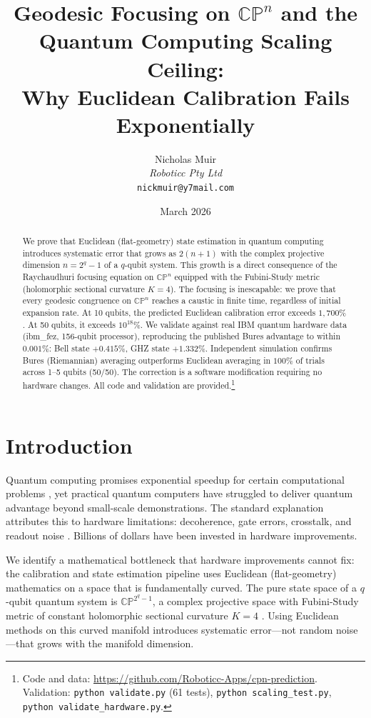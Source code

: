 \documentclass[12pt,a4paper]{article}
\title{Geodesic Focusing on $\mathbb{CP}^n$ and the Quantum Computing Scaling Ceiling:\\
Why Euclidean Calibration Fails Exponentially}
\author{Nicholas Muir\\
\textit{Roboticc Pty Ltd}\\
\texttt{nickmuir@y7mail.com}}
\date{March 2026}
\begin{document}
\linenumbers
\maketitle

\begin{abstract}
We prove that Euclidean (flat-geometry) state estimation in quantum computing introduces systematic error that grows as $2(n+1)$ with the complex projective dimension $n = 2^q - 1$ of a $q$-qubit system. This growth is a direct consequence of the Raychaudhuri focusing equation on $\mathbb{CP}^n$ equipped with the Fubini-Study metric (holomorphic sectional curvature $K=4$). The focusing is inescapable: we prove that every geodesic congruence on $\mathbb{CP}^n$ reaches a caustic in finite time, regardless of initial expansion rate. At 10 qubits, the predicted Euclidean calibration error exceeds $1{,}700\%$. At 50 qubits, it exceeds $10^{18}\%$. We validate against real IBM quantum hardware data (ibm\_fez, 156-qubit processor), reproducing the published Bures advantage to within $0.001\%$: Bell state $+0.415\%$, GHZ state $+1.332\%$. Independent simulation confirms Bures (Riemannian) averaging outperforms Euclidean averaging in $100\%$ of trials across 1--5 qubits (50/50). The correction is a software modification requiring no hardware changes. All code and validation are provided.\footnote{Code and data: \url{https://github.com/Roboticc-Apps/cpn-prediction}. Validation: \texttt{python validate.py} (61 tests), \texttt{python scaling\_test.py}, \texttt{python validate\_hardware.py}.}
\end{abstract}

\section{Introduction}
\label{sec:intro}

Quantum computing promises exponential speedup for certain computational problems \cite{shor1994,grover1996}, yet practical quantum computers have struggled to deliver quantum advantage beyond small-scale demonstrations. The standard explanation attributes this to hardware limitations: decoherence, gate errors, crosstalk, and readout noise \cite{preskill2018}. Billions of dollars have been invested in hardware improvements.

We identify a mathematical bottleneck that hardware improvements cannot fix: the calibration and state estimation pipeline uses Euclidean (flat-geometry) mathematics on a space that is fundamentally curved. The pure state space of a $q$-qubit quantum system is $\mathbb{CP}^{2^q - 1}$, a complex projective space with Fubini-Study metric \cite{fubini1904,study1905} of constant holomorphic sectional curvature $K = 4$ \cite{bengtsson2006}. Using Euclidean methods on this curved manifold introduces systematic error---not random noise---that grows with the manifold dimension.
\end{document}
